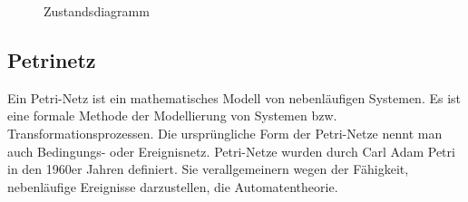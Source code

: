 \begin{figure}[H]
    \begin{center}
        \caption{Zustandsdiagramm}
        \label{fig:zustandsdiagramm}
        \end{center}
        \end{figure}
        
        
        \subsection{Petrinetz}
        Ein Petri-Netz ist ein mathematisches Modell von nebenläufigen Systemen. Es ist eine formale Methode der Modellierung von Systemen bzw. Transformationsprozessen. Die ursprüngliche Form der Petri-Netze nennt man auch Bedingungs- oder Ereignisnetz. Petri-Netze wurden durch Carl Adam Petri in den 1960er Jahren definiert. Sie verallgemeinern wegen der Fähigkeit, nebenläufige Ereignisse  darzustellen, die Automatentheorie.
        
